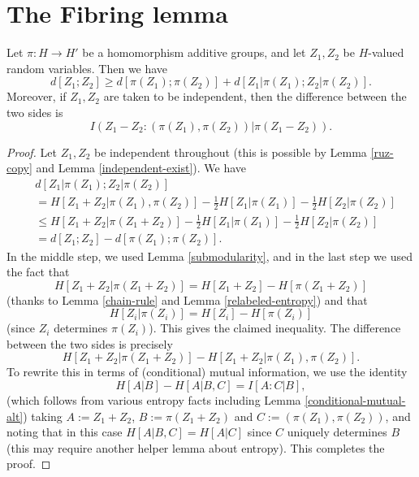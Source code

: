 \chapter{The Fibring lemma}

\begin{proposition}\label{fibring-ident}
  \leanok
  Let $\pi : H \to H'$ be a homomorphism additive groups, and let $Z_1,Z_2$ be $H$-valued random variables. Then we have
  \[
    d[Z_1; Z_2] \geq d[\pi(Z_1);\pi(Z_2)] + d[Z_1|\pi(Z_1); Z_2 |\pi(Z_2)].
  \]
  Moreover, if $Z_1,Z_2$ are taken to be independent, then the difference between the two sides is
$$I( Z_1 - Z_2 : (\pi(Z_1), \pi(Z_2))  |  \pi(Z_1 - Z_2) ).$$
\end{proposition}


\begin{proof}
  Let $Z_1,Z_2$ be independent throughout (this is possible by Lemma \ref{ruz-copy} and Lemma \ref{independent-exist}).  We have
  \begin{align*}
    & d[Z_1  |\pi(Z_1); Z_2 |\pi(Z_2)] \\
    & = H[ Z_1 + Z_2 | \pi(Z_1),\pi(Z_2)] - \tfrac{1}{2} H[Z_1 | \pi(Z_1)] - \tfrac{1}{2} H[Z_2 | \pi(Z_2)] \\
    & \leq  H[ Z_1 + Z_2 | \pi(Z_1+Z_2)]  - \tfrac{1}{2} H[Z_1 | \pi(Z_1)] - \tfrac{1}{2}H[Z_2 | \pi(Z_2)] \\
    & = d[Z_1;Z_2] - d[\pi(Z_1);\pi(Z_2)].
  \end{align*}
  In the middle step, we used Lemma \ref{submodularity}, and in the last step we used the fact that
  \[ H[Z_1 + Z_2 |  \pi(Z_1+Z_2)] = H[Z_1 + Z_2] - H[\pi(Z_1+Z_2)]\]
  (thanks to Lemma \ref{chain-rule} and Lemma \ref{relabeled-entropy}) and that
  \[ H[Z_i| \pi(Z_i)] = H[Z_i] - H[\pi(Z_i)]\] (since $Z_i$ determines $\pi(Z_i)$).
  This gives the claimed inequality. The difference between the two sides is precisely
  \[ H[Z_1 + Z_2  | \pi(Z_1 + Z_2)] - H[Z_1 + Z_2  | \pi(Z_1),\pi(Z_2)].\]
  To rewrite this in terms of (conditional) mutual information, we use the identity
  \[ H[A|B] - H[A | B,C] = I[A : C | B],\]
  (which follows from various entropy facts including Lemma \ref{conditional-mutual-alt})
  taking
  $A := Z_1 + Z_2$, $B := \pi(Z_1 + Z_2)$ and $C := (\pi(Z_1),\pi(Z_{2}))$, and noting that in this case $H[A | B,C] = H[A | C]$ since $C$ uniquely determines $B$ (this may require another helper lemma about entropy).
  This completes the proof.
\end{proof}

